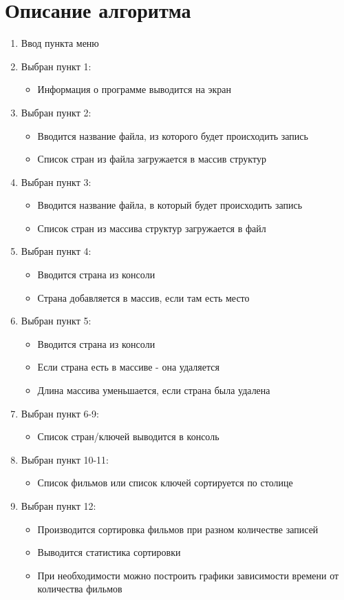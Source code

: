 \section{Описание алгоритма}
\begin{enumerate}
	\item Ввод пункта меню
	\item Выбран пункт 1:
	\begin{itemize}
		\item Информация о программе выводится на экран
	\end{itemize}
	\item Выбран пункт 2:
	\begin{itemize}
		\item Вводится название файла, из которого будет происходить запись
		\item Список стран из файла загружается в массив структур
	\end{itemize}
	\item Выбран пункт 3:
	\begin{itemize}
		\item Вводится название файла, в который будет происходить запись
		\item Список стран из массива структур загружается в файл
	\end{itemize}
	\item Выбран пункт 4:
	\begin{itemize}
		\item Вводится страна из консоли
		\item Страна добавляется в массив, если там есть место
	\end{itemize}
	\item Выбран пункт 5:
	\begin{itemize}
		\item Вводится страна из консоли
		\item Если страна есть в массиве - она удаляется
		\item Длина массива уменьшается, если страна была удалена
	\end{itemize}
	\item Выбран пункт 6-9:
	\begin{itemize}
		\item Список стран/ключей выводится в консоль
	\end{itemize}
	\item Выбран пункт 10-11:
	\begin{itemize}
		\item Список фильмов или список ключей сортируется по столице
	\end{itemize}
	\item Выбран пункт 12:
	\begin{itemize}
		\item Производится сортировка фильмов при разном количестве записей
		\item Выводится статистика сортировки
		\item При необходимости можно построить графики зависимости времени от количества фильмов
	\end{itemize}
\end{enumerate}

